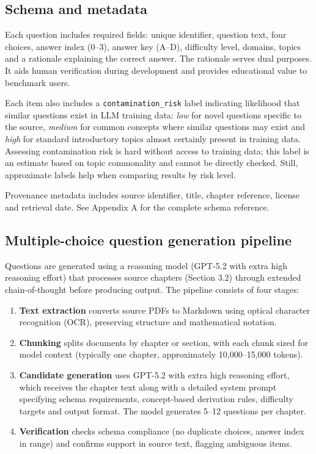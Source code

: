 \documentclass[11pt]{article}
\begin{document}

\subsection{Schema and metadata}

Each question includes required fields: unique identifier, question text, four choices, answer index (0--3), answer key (A--D), difficulty level, domains, topics and a rationale explaining the correct answer. The rationale serves dual purposes. It aids human verification during development and provides educational value to benchmark users.

Each item also includes a \texttt{contamination\_risk} label indicating likelihood that similar questions exist in LLM training data: \textit{low} for novel questions specific to the source, \textit{medium} for common concepts where similar questions may exist and \textit{high} for standard introductory topics almost certainly present in training data. Assessing contamination risk is hard without access to training data; this label is an estimate based on topic commonality and cannot be directly checked. Still, approximate labels help when comparing results by risk level.

Provenance metadata includes source identifier, title, chapter reference, license and retrieval date. See Appendix A for the complete schema reference.


\subsection{Multiple-choice question generation pipeline}

Questions are generated using a reasoning model (GPT-5.2 \cite{gpt52} with extra high reasoning effort) that processes source chapters (Section 3.2) through extended chain-of-thought before producing output. The pipeline consists of four stages:

\begin{enumerate}
\item \textbf{Text extraction} converts source PDFs to Markdown using optical character recognition (OCR), preserving structure and mathematical notation.
\item \textbf{Chunking} splits documents by chapter or section, with each chunk sized for model context (typically one chapter, approximately 10,000--15,000 tokens).
\item \textbf{Candidate generation} uses GPT-5.2 with extra high reasoning effort, which receives the chapter text along with a detailed system prompt specifying schema requirements, concept-based derivation rules, difficulty targets and output format. The model generates 5--12 questions per chapter.
\item \textbf{Verification} checks schema compliance (no duplicate choices, answer index in range) and confirms support in source text, flagging ambiguous items.
\end{enumerate}
\end{document}
